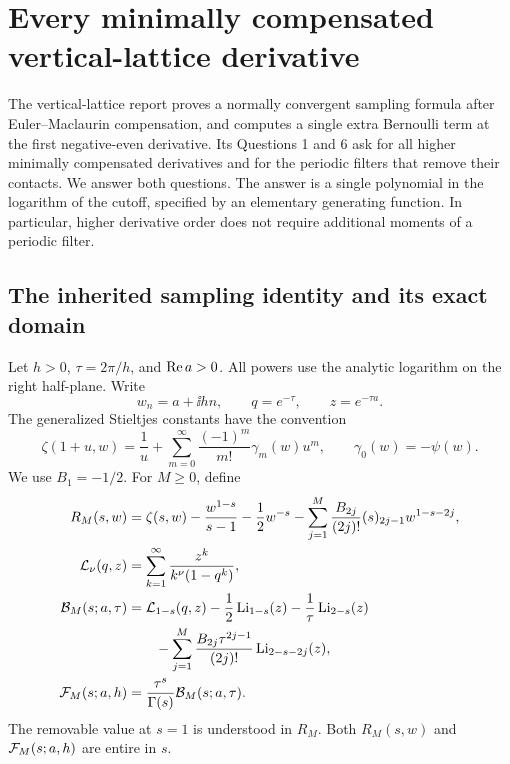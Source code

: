\section{Every minimally compensated vertical-lattice derivative}
\label{sec:lattice}

The vertical-lattice report \cite{RepoVertical} proves a normally
convergent sampling formula after Euler--Maclaurin compensation, and
computes a single extra Bernoulli term at the first negative-even
derivative. Its Questions 1 and 6 ask for all higher minimally
compensated derivatives and for the periodic filters that remove their
contacts. We answer both questions. The answer is a single polynomial
in the logarithm of the cutoff, specified by an elementary generating
function. In particular, higher derivative order does not require
additional moments of a periodic filter.

\subsection{The inherited sampling identity and its exact domain}

Let \(h>0\), \(\tau=2\pi/h\), and \(\operatorname{Re} a>0\). All powers use the
analytic logarithm on the right half-plane. Write
\[
 w_n=a+\ii hn,\qquad q=e^{-\tau},\qquad z=e^{-\tau a}.
\]
The generalized Stieltjes constants have the convention
\begin{equation}\label{eq:lattice-stieltjes}
 \zeta(1+u,w)=\frac1u+
       \sum_{m=0}^{\infty}\frac{(-1)^m}{m!}\gamma_m(w)u^m,
 \qquad \gamma_0(w)=-\psi(w).
\end{equation}
We use \(B_1=-1/2\). For \(M\geq0\), define
\begin{align}
 R_M(s,w)&=\zeta(s,w)-\frac{w^{1-s}}{s-1}-\frac12w^{-s}
 -\sum_{j=1}^{M}\frac{B_{2j}}{(2j)!}(s)_{2j-1}w^{1-s-2j},
 \label{eq:root-remainder}\\
 {\cal L}_{\nu}(q,z)&=\sum_{k=1}^{\infty}
             \frac{z^k}{k^\nu(1-q^k)},\label{eq:root-lambert}\\
 {\cal B}_M(s;a,\tau)&={\cal L}_{1-s}(q,z)
       -\frac12\operatorname{Li}_{1-s}(z)-\frac1\tau\operatorname{Li}_{2-s}(z)\notag\\
 &\hspace{7mm}
       -\sum_{j=1}^{M}\frac{B_{2j}\tau^{2j-1}}{(2j)!}
                    \operatorname{Li}_{2-s-2j}(z),\label{eq:root-bracket}\\
 {\cal F}_M(s;a,h)&=\frac{\tau^s}{\Gamma(s)}{\cal B}_M(s;a,\tau).
 \label{eq:root-spectral}
\end{align}
The removable value at \(s=1\) is understood in \(R_M\).
Both \(R_M(s,w)\) and \({\cal F}_M(s;a,h)\) are entire in \(s\).

